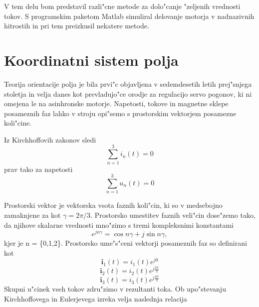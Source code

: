 \documentclass[journal,a4paper,twoside]{sty/IEEEtran}
\begin{document}
V tem delu bom predstavil razli"cne metode za dolo"canje "zeljenih vrednosti tokov.
S programskim paketom Matlab simuliral delovanje motorja v nadnazivnih hitrostih in pri tem preizkusil nekatere metode.
\section{Koordinatni sistem polja}

Teorija orientacije polja je bila prvi"c objavljena v sedemdesetih letih prej"snjega stoletja in velja danes kot prevladujo"ce orodje za regulacijo servo pogonov, ki ni omejena le na asinhronske motorje. Napetosti, tokove in magnetne sklepe posameznih faz lahko v stroju opi"semo s prostorskim vektorjem posamezne koli"cine. 

%
Iz Kirchhoffovih zakonov sledi \begin{equation}
\sum_{n=1}^3 i_n(t)=0
\end{equation} prav tako za napetosti \begin{equation}
\sum_{n=1}^3 u_n(t)=0
\end{equation}



Prostorski vektor je vektorska vsota faznih koli"cin, ki so v medsebojno zamaknjene za kot  $\gamma=2 \pi/3$. Prostorsko umestitev faznih veli"cin dose"zemo tako, da njihove skalarne vrednosti mno"zimo s tremi kompleksnimi konstantami$$e^{j n \gamma}=\cos n \gamma +j \sin n \gamma,$$ kjer je n = \{0,1,2\}. Prostorsko ume"s"ceni vektorji posameznih faz so definirani kot
$$\textbf{i}_1(t)=i_1(t) e^{j 0} $$ 
$$\textbf{i}_2(t)=i_2(t) e^{j \frac{2\pi}{3}} $$ 
$$\textbf{i}_3(t)=i_3(t) e^{j \frac{4\pi}{3}} $$
Skupni u"cinek vseh tokov zdru"zimo v rezultanti toka. Ob upo"stevanju Kirchhoffovega in Eulerjevega izreka velja naslednja relacija
\end{document}
